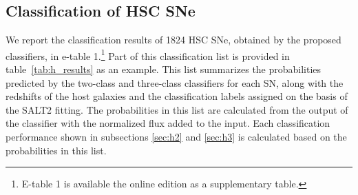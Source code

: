 \documentclass[proof]{pasj01}
\providecommand{\DIFadd}[1]{{\protect\color{blue} \sf #1}} %
\providecommand{\DIFdel}[1]{{\protect\color{red} \scriptsize #1}} %
\providecommand{\DIFaddbegin}{\protect\color{blue}} %
\providecommand{\DIFaddend}{\protect\color{black}} %
\providecommand{\DIFdelbegin}{\protect\color{red}} %
\providecommand{\DIFdelend}{\protect\color{black}} %
\newcommand{\DIFscaledelfig}{0.5}
\newlength{\DIFdelgraphicswidth} %
\newlength{\DIFdelgraphicsheight} %
\newcommand{\DIFaddincludegraphics}[2][]{{\color{blue}\fbox{\DIFOincludegraphics[#1]{#2}}}} %
\newcommand{\DIFdelincludegraphics}[2][]{%
\sbox{\DIFdelgraphicsbox}{\DIFOincludegraphics[#1]{#2}}%
\settoboxwidth{\DIFdelgraphicswidth}{\DIFdelgraphicsbox} %
\settoboxtotalheight{\DIFdelgraphicsheight}{\DIFdelgraphicsbox} %
\scalebox{\DIFscaledelfig}{%
\parbox[b]{\DIFdelgraphicswidth}{\usebox{\DIFdelgraphicsbox}\\[-\baselineskip] \rule{\DIFdelgraphicswidth}{0em}}\llap{\resizebox{\DIFdelgraphicswidth}{\DIFdelgraphicsheight}{%
\setlength{\unitlength}{\DIFdelgraphicswidth}%
\begin{picture}(1,1)%
\thicklines\linethickness{2pt} %
{\color[rgb]{1,0,0}\put(0,0){\framebox(1,1){}}}%
{\color[rgb]{1,0,0}\put(0,0){\line( 1,1){1}}}%
{\color[rgb]{1,0,0}\put(0,1){\line(1,-1){1}}}%
\end{picture}%
}\hspace*{3pt}}} %
} %
\DeclareRobustCommand{\DIFaddbegin}{\DIFOaddbegin \let\includegraphics\DIFaddincludegraphics} %
\DeclareRobustCommand{\DIFaddend}{\DIFOaddend \let\includegraphics\DIFOincludegraphics} %
\DeclareRobustCommand{\DIFdelbegin}{\DIFOdelbegin \let\includegraphics\DIFdelincludegraphics} %
\DeclareRobustCommand{\DIFdelend}{\DIFOaddend \let\includegraphics\DIFOincludegraphics} %
\begin{document}
%
\subsection{Classification of HSC SNe}
%
We report the classification results of 1824 HSC SNe, obtained by the proposed classifiers, in e-table 1.\footnote{ E-table 1 is available \DIFdelbegin \DIFdel{on }\DIFdelend \DIFaddbegin \DIFadd{in }\DIFaddend the online edition as a supplementary table. }
Part of this classification list is provided in table\ \ref{tab:h_results} as an example.
This list summarizes the probabilities predicted by the two-class and three-class classifiers for each SN, along with the redshifts of the host galaxies and the classification labels assigned on the basis of the SALT2 fitting.
The probabilities in this list are calculated from the output of the classifier with the normalized flux added to the input.
Each classification performance shown in subsections \ref{sec:h2} and \ref{sec:h3} is calculated based on the probabilities in this list.
\end{document}
